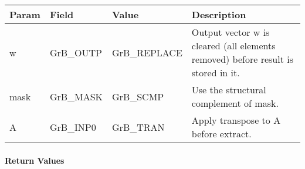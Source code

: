 \begin{itemize}[leftmargin=1in]
    \begin{tabular}{lllp{2.5in}}
        Param & Field  & Value & Description \\
        \hline
        {\sf w}    & {\sf GrB\_OUTP} & {\sf GrB\_REPLACE} & Output vector {\sf w}
        is cleared (all elements removed) before result is stored in it. \\
        
        {\sf mask} & {\sf GrB\_MASK} & {\sf GrB\_SCMP} & Use the structural
        complement of {\sf mask}. \\
        
        {\sf A}    & {\sf GrB\_INP0} & {\sf GrB\_TRAN} & Apply transpose to 
        {\sf A} before extract. \\
    \end{tabular}
\end{itemize}

\paragraph{Return Values}

